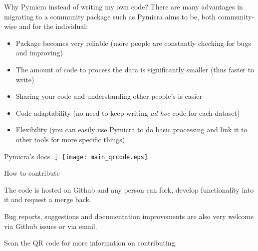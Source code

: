 \documentclass[final]{beamer}
\newlength{\onecolwid}
\newcommand{\bsize}{\fontsize{40}{50}\selectfont}
\begin{document}
\begin{frame}[t]
\begin{columns}[t]
\begin{column}{\onecolwid}




\begin{alertblock}{Why Pymicra instead of writing my own code?}
\bsize
There are many advantages in migrating to a community package such as Pymicra
aims to be, both community-wise and for the individual: 
\begin{itemize}
\item Package becomes very reliable (more people are constantly checking for
bugs and improving)
\item The amount of code to process the data is significantly smaller (thus faster
to write)
\item Sharing your code and understanding other people's is easier
\end{itemize}

\vspace{1cm}

\begin{minipage}[]{.74\columnwidth}
\begin{itemize}
\item Code adaptability (no need to keep writing \emph{ad hoc} code for each dataset)
\item Flexibility (you can easily use Pymicra to do basic processing and link it
to other tools for more specific things)
\end{itemize}
\end{minipage}
\begin{minipage}[]{.25\columnwidth}
\begin{flushright}
Pymicra's docs $\downarrow$
\texttt{[image: main\_qrcode.eps]}
\end{flushright}
\end{minipage}
\end{alertblock}


\begin{alertblock}{How to contribute}
\bsize

The code is hosted on Github and any person can fork, develop functionality into
it and request a merge back. 

\begin{minipage}[]{.74\columnwidth}
Bug reports, suggestions and documentation
improvements are also very welcome via Github issues or via email.

\vspace{.3cm}
Scan the QR code for more information on contributing.


\end{minipage}
\end{alertblock}
\end{column}
\end{columns}
\end{frame}
\end{document}
